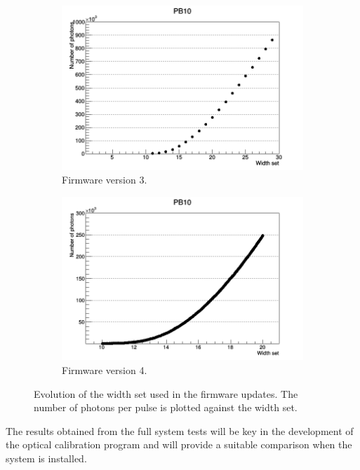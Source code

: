 \begin{figure}[ht!]
\begin{subfigure}[b]{.475\linewidth}
        \includegraphics[width=\textwidth]{Figures/Plots/V3_widthsetVSNphPB10.png}
        \caption{Firmware version 3.}
        \label{fig:width3}
    \end{subfigure}
    \hfill
    \begin{subfigure}[b]{.475\linewidth}
        \centering
        \includegraphics[width=\textwidth]{Figures/Plots/V4_widthsetVSNphPB10.png}
        \caption{Firmware version 4.}
        \label{fig:width4}
    \end{subfigure}
    \caption{Evolution of the width set used in the firmware updates. The number of photons per pulse is plotted against the width set.}
    \label{fig:widthset}
\end{figure}
\newline
The results obtained from the full system tests will be key in the development of the optical calibration program and will provide a suitable comparison when the system is installed.